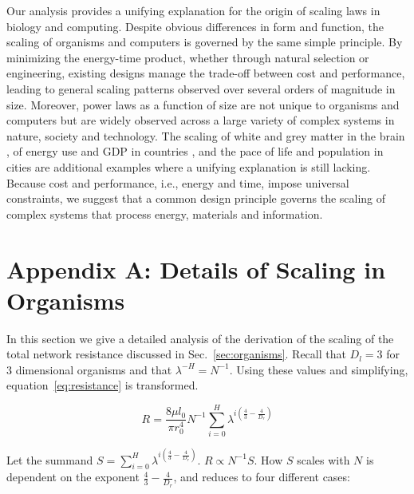 \documentclass[12pt]{article}
\begin{document}
Our analysis provides a unifying explanation for the origin of scaling laws in
biology and computing. Despite obvious differences in form and function, the
scaling of organisms and computers is governed by the same simple principle.
By minimizing the energy-time product, whether through natural selection or
engineering, existing designs manage the trade-off between cost and
performance, leading to general scaling patterns observed over several orders
of magnitude in size.  Moreover, power laws as a function of size are not
unique to organisms and computers but are widely observed across a large
variety of complex systems in nature, society and technology.  The scaling of
white and grey matter in the brain \cite{zhang00}, of energy use and GDP in
countries \cite{brown11}, and the pace of life and population in cities
\cite{bettencourt07} are additional examples where a unifying explanation is
still lacking.  Because cost and performance, i.e., energy and time, impose
universal constraints, we suggest that a common design principle governs the
scaling of complex systems that process energy, materials and information.


\section{Appendix A: Details of Scaling in Organisms}
\label{sec:AppendixOrg}

In this section we give a detailed analysis of the derivation of the scaling of
the total network resistance discussed in Sec.~\ref{sec:organisms}. Recall
that $D_l = 3$ for $3$ dimensional organisms and that $\lambda^{-H}=N^{-1}$.
Using these values and simplifying, equation~\ref{eq:resistance} is
transformed. 

\begin{equation}
 R = \frac{8 \mu l_0}{\pi r_0^4} N^{-1} \sum_{i=0}^H \lambda^{i(\frac{4}{3} -\frac{4}{D_r})}
\end{equation}

Let the summand $S = \sum_{i=0}^H \lambda^{i(\frac{4}{3} -\frac{4}{D_r})}$. $R \propto
N^{-1} S$. How $S$ scales with $N$ is dependent on the exponent $\frac{4}{3} -
\frac{4}{D_r}$, and reduces to four different cases:
\end{document}
